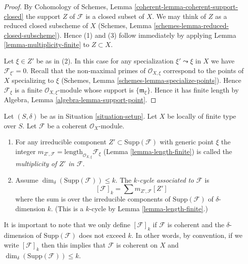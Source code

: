 \begin{proof}
By Cohomology of Schemes, Lemma \ref{coherent-lemma-coherent-support-closed}
the support $Z$ of $\mathcal{F}$ is a closed subset of $X$.
We may think of $Z$ as a reduced closed subscheme of $X$
(Schemes, Lemma \ref{schemes-lemma-reduced-closed-subscheme}).
Hence (1) and (3) follow immediately by applying
Lemma \ref{lemma-multiplicity-finite} to $Z \subset X$.

\medskip\noindent
Let $\xi \in Z'$ be as in (2). In this case for any specialization
$\xi' \leadsto \xi$ in $X$ we have $\mathcal{F}_{\xi'} = 0$.
Recall that the non-maximal primes of $\mathcal{O}_{X, \xi}$ correspond
to the points of $X$ specializing to $\xi$
(Schemes, Lemma \ref{schemes-lemma-specialize-points}).
Hence $\mathcal{F}_\xi$ is a finite $\mathcal{O}_{X, \xi}$-module
whose support is $\{\mathfrak m_\xi\}$. Hence it has finite length
by Algebra, Lemma \ref{algebra-lemma-support-point}.
\end{proof}

\begin{definition}
\label{definition-cycle-associated-to-coherent-sheaf}
Let $(S, \delta)$ be as in Situation \ref{situation-setup}.
Let $X$ be locally of finite type over $S$.
Let $\mathcal{F}$ be a coherent $\mathcal{O}_X$-module.
\begin{enumerate}
\item For any irreducible component $Z' \subset \text{Supp}(\mathcal{F})$
with generic point $\xi$ the integer
$m_{Z', \mathcal{F}} = \text{length}_{\mathcal{O}_{X, \xi}} \mathcal{F}_\xi$
(Lemma \ref{lemma-length-finite})
is called the {\it multiplicity of $Z'$ in $\mathcal{F}$}.
\item Assume $\dim_\delta(\text{Supp}(\mathcal{F})) \leq k$.
The {\it $k$-cycle associated to $\mathcal{F}$} is
$$
[\mathcal{F}]_k
=
\sum m_{Z', \mathcal{F}}[Z']
$$
where the sum is over the irreducible components of
$\text{Supp}(\mathcal{F})$ of $\delta$-dimension $k$.
(This is a $k$-cycle by Lemma \ref{lemma-length-finite}.)
\end{enumerate}
\end{definition}

\noindent
It is important to note that we only define $[\mathcal{F}]_k$
if $\mathcal{F}$ is coherent and the $\delta$-dimension
of $\text{Supp}(\mathcal{F})$ does not exceed $k$. In other words,
by convention, if we write $[\mathcal{F}]_k$ then this implies that
$\mathcal{F}$ is coherent on $X$ and
$\dim_\delta(\text{Supp}(\mathcal{F})) \leq k$.


